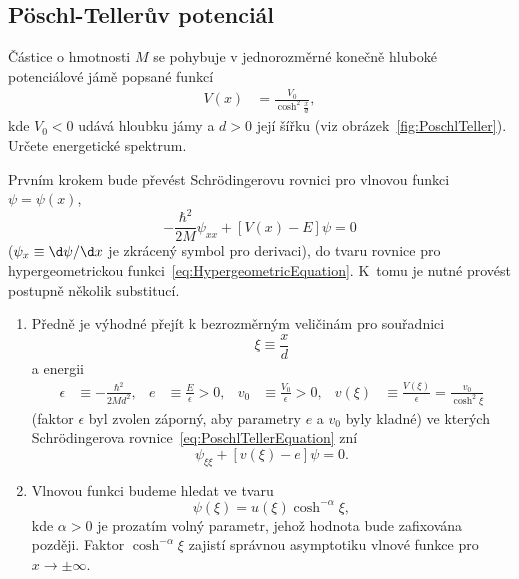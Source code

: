 \subsection{Pöschl-Tellerův potenciál}
    Částice o hmotnosti $M$ se pohybuje v jednorozměrné konečně hluboké potenciálové jámě popsané funkcí
    \begin{align}
        V(x)&=\frac{V_{0}}{\cosh^{2}\frac{x}{d}},
    \end{align}
    kde $V_{0}<0$ udává hloubku jámy a $d>0$ její šířku (viz obrázek~\ref{fig:PoschlTeller}).
    Určete energetické spektrum.

\begin{solution}
    Prvním krokem bude převést Schrödingerovu rovnici pro vlnovou funkci $\psi=\psi(x)$,
    \begin{equation}
        \label{eq:PoschlTellerEquation}
        -\frac{\hbar^{2}}{2M}\psi_{xx}+\left[V(x)-E\right]\psi=0
    \end{equation}
    ($\psi_{x}\equiv\d\psi/\d x$ je zkrácený symbol pro derivaci), do tvaru rovnice pro hypergeometrickou funkci~\eqref{eq:HypergeometricEquation}.
    K~tomu je nutné provést postupně několik substitucí.

    \begin{enumerate}
    \item
        Předně je výhodné přejít k bezrozměrným veličinám pro souřadnici
        \begin{equation}
            \xi\equiv\frac{x}{d}
        \end{equation}
        a energii
        \begin{align}
            \epsilon&\equiv-\frac{\hbar^{2}}{2Md^{2}},
            &e&\equiv\frac{E}{\epsilon}>0,
            &v_{0}&\equiv\frac{V_{0}}{\epsilon}>0,
            &v(\xi)&\equiv\frac{V(\xi)}{\epsilon}=\frac{v_{0}}{\cosh^{2}\xi}
        \end{align}
        (faktor $\epsilon$ byl zvolen záporný, aby parametry $e$ a $v_{0}$ byly kladné)
        ve kterých Schrödingerova rovnice~\eqref{eq:PoschlTellerEquation} zní
        \begin{equation}
            \label{eq:PoschlTellerEquationXi}
            \psi_{\xi\xi}+\left[v(\xi)-e\right]\psi=0.
        \end{equation}

    \item
        Vlnovou funkci budeme hledat ve tvaru
        \begin{equation}
            \psi(\xi)=u(\xi)\cosh^{-\alpha}\xi,
        \end{equation}
        kde $\alpha>0$ je prozatím volný parametr, jehož hodnota bude zafixována později.
        Faktor $\cosh^{-\alpha}\xi$ zajistí správnou asymptotiku vlnové funkce pro $x\rightarrow\pm\infty$.
        

\end{enumerate}
\end{solution}
